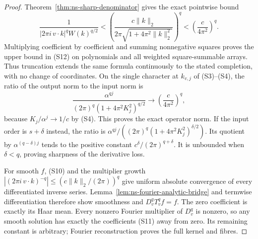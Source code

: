 \begin{proof}
Theorem~\ref{thm:ns-sharp-denominator} gives the exact pointwise bound
\[
 \frac1{|2\pi i\,v\cdot k|^q W(k)^{q/2}}
 <\left(\frac{c\|k\|_2}{2\pi\sqrt{1+4\pi^2\|k\|_2^2}}\right)^q
 <\left(\frac c{4\pi^2}\right)^q.                   \tag{S13}
\]
Multiplying coefficient by coefficient and summing nonnegative
squares proves the upper bound in (S12) on polynomials and all
weighted square-summable arrays. Thus truncation extends the same
formula continuously to the stated completion, with no change of
coordinates. On the single character at $k_{v,j}$ of (S3)--(S4),
the ratio of the output norm to the input norm is
\[
 \frac{\alpha^{qj}}{(2\pi)^q(1+4\pi^2K_j^2)^{q/2}}
        \longrightarrow\left(\frac c{4\pi^2}\right)^q,
\]
because $K_j/\alpha^j\to1/c$ by (S4). This proves the exact
operator norm. If the input order is $s+\delta$ instead, the ratio
is
$\alpha^{qj}/((2\pi)^q(1+4\pi^2K_j^2)^{\delta/2})$.
Its quotient by $\alpha^{(q-\delta)j}$ tends to the positive
constant $c^\delta/(2\pi)^{q+\delta}$. It is unbounded when
$\delta<q$, proving sharpness of the derivative loss.

For smooth $f$, (S10) and the multiplier growth
$|(2\pi i\,v\cdot k)^{-q}|\leq(c\|k\|_2/(2\pi))^q$
give uniform absolute convergence of every differentiated inverse
series. Lemma~\ref{lem:ns-fourier-analytic-bridge} and termwise
differentiation therefore show smoothness and $D_v^qT_v^qf=f$.
The zero coefficient is exactly its Haar mean. Every nonzero
Fourier multiplier of $D_v^q$ is nonzero, so any smooth solution
has exactly the coefficients (S11) away from zero. Its remaining
constant is arbitrary; Fourier reconstruction proves the full
kernel and fibres.


\end{proof}
